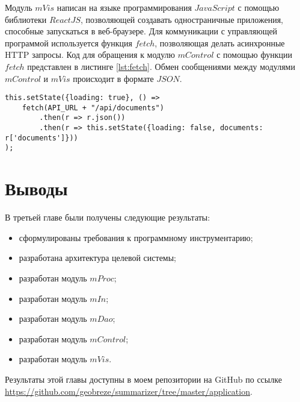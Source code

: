 Модуль $mVis$ написан на языке программирования $JavaScript$ с помощью библиотеки $ReactJS$, позволяющей создавать одностраничные приложения, способные запускаться в веб-браузере. Для коммуникации с управляющей программой используется функция $fetch$, позволяющая делать асинхронные HTTP запросы. Код для обращения к модулю $mControl$ с помощью функции $fetch$ представлен в листинге \hyperref[lst:fetch]{\ref{lst:fetch}}. Обмен сообщениями между модулями $mControl$ и $mVis$ происходит в формате $JSON$.
\begin{minipage}[H]{\textwidth}
\begin{lstlisting}[caption=Обращение к модулю mControl, label=lst:fetch]
this.setState({loading: true}, () =>
    fetch(API_URL + "/api/documents")
        .then(r => r.json())
        .then(r => this.setState({loading: false, documents: r['documents']}))
);
\end{lstlisting}
\end{minipage}

\section{Выводы}

В третьей главе были получены следующие результаты:
\begin{itemize}
\item сформулированы требования к программному инструментарию;
\item разработана архитектура целевой системы;
\item разработан модуль $mProc$;
\item разработан модуль $mIn$;
\item разработан модуль $mDao$;
\item разработан модуль $mControl$;
\item разработан модуль $mVis$.
\end{itemize}

Результаты этой главы доступны в моем репозитории на GitHub по ссылке \url{https://github.com/geobreze/summarizer/tree/master/application}. 

\newpage